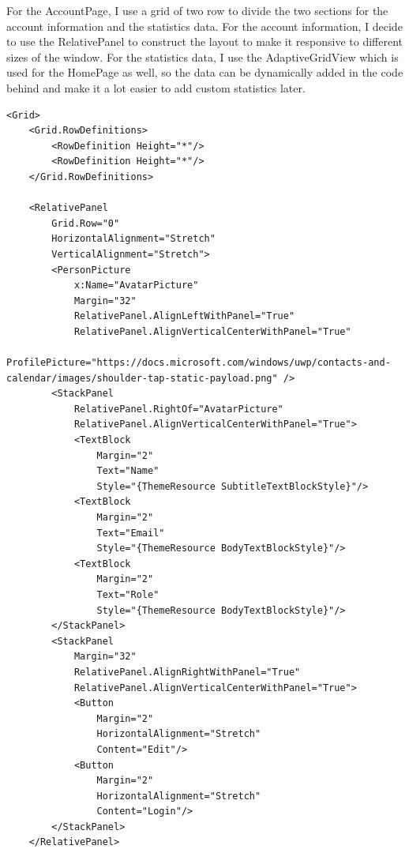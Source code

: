 \documentclass[a4paper]{report}
\begin{document}
For the AccountPage, I use a grid of two row to divide the two sections for the account information and the statistics data. For the account information, I decide to use the RelativePanel to construct the layout to make it responsive to different sizes of the window. For the statistics data, I use the AdaptiveGridView which is used for the HomePage as well, so the data can be dynamically added in the code behind and make it a lot easier to add custom statistics later.

\begin{verbatim}
<Grid>
    <Grid.RowDefinitions>
        <RowDefinition Height="*"/>
        <RowDefinition Height="*"/>
    </Grid.RowDefinitions>

    <RelativePanel
        Grid.Row="0"
        HorizontalAlignment="Stretch"
        VerticalAlignment="Stretch">
        <PersonPicture
            x:Name="AvatarPicture"
            Margin="32"
            RelativePanel.AlignLeftWithPanel="True"
            RelativePanel.AlignVerticalCenterWithPanel="True"
            ProfilePicture="https://docs.microsoft.com/windows/uwp/contacts-and-calendar/images/shoulder-tap-static-payload.png" />
        <StackPanel
            RelativePanel.RightOf="AvatarPicture"
            RelativePanel.AlignVerticalCenterWithPanel="True">
            <TextBlock
                Margin="2"
                Text="Name"
                Style="{ThemeResource SubtitleTextBlockStyle}"/>
            <TextBlock
                Margin="2"
                Text="Email"
                Style="{ThemeResource BodyTextBlockStyle}"/>
            <TextBlock
                Margin="2"
                Text="Role"
                Style="{ThemeResource BodyTextBlockStyle}"/>
        </StackPanel>
        <StackPanel
            Margin="32"
            RelativePanel.AlignRightWithPanel="True"
            RelativePanel.AlignVerticalCenterWithPanel="True">
            <Button
                Margin="2"
                HorizontalAlignment="Stretch"
                Content="Edit"/>
            <Button
                Margin="2"
                HorizontalAlignment="Stretch"
                Content="Login"/>
        </StackPanel>
    </RelativePanel>


\end{verbatim}
\end{document}

